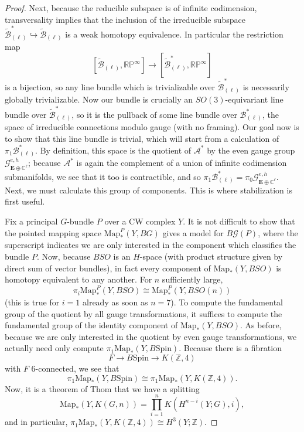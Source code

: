 \documentclass[10pt,a4paper]{amsart}
\theoremstyle{definition}
\theoremstyle{remark}
\numberwithin{figure}{qchap}
\begin{document}
\begin{proof}
Next, because the reducible subspace is of infinite codimension, transversality implies that the inclusion of the irreducible subspace $\widetilde{\mathcal B}_{(\ell)}^* \hookrightarrow \widetilde{\mathcal B}_{(\ell)}$ is a weak homotopy equivalence. In particular the restriction map $$[\widetilde{\mathcal B}_{(\ell)}, \mathbb{RP}^\infty] \to [\widetilde{\mathcal B}_{(\ell)}^*, \mathbb{RP}^\infty]$$ is a bijection, so any line bundle which is trivializable over $\widetilde{\mathcal B}_{(\ell)}^*$ is necessarily globally trivializable. Now our bundle is crucially an $SO(3)$-equivariant line bundle over $\widetilde{\mathcal B}_{(\ell)}^*$, so it is the pullback of some line bundle over $\mathcal B^{*}_{(\ell)}$, the space of irreducible connections modulo gauge (with no framing). Our goal now is to show that this line bundle is trivial, which will start from a calculation of $\pi_1 \mathcal B^*_{(\ell)}$. By definition, this space is the quotient of $\mathcal A^*$ by the even gauge group $\mathcal G^{e,h}_{\mathbf{E} \oplus \mathbb C^\ell}$; because $\mathcal A^*$ is again the complement of a union of infinite codimension submanifolds, we see that it too is contractible, and so $\pi_1 \mathcal B^*_{(\ell)} = \pi_0 \mathcal G^{e,h}_{\mathbf{E} \oplus \mathbb C^\ell}$. Next, we must calculate this group of components. This is where stabilization is first useful.

Fix a principal $G$-bundle $P$ over a CW complex $Y$. It is not difficult to show that the pointed mapping space $\text{Map}^P_*(Y, BG)$ gives a model for $B\mathcal G(P)$, where the superscript indicates we are only interested in the component which classifies the bundle $P$. Now, because $BSO$ is an $H$-space (with product structure given by direct sum of vector bundles), in fact every component of $\text{Map}_*(Y, BSO)$ is homotopy equivalent to any another. For $n$ sufficiently large, 
$$\pi_i \text{Map}^P_*(Y, BSO) \cong \text{Map}^P_*(Y, BSO(n))$$ 
(this is true for $i=1$ already as soon as $n = 7$). To compute the fundamental group of the quotient by all gauge transformations, it suffices to compute the fundamental group of the identity component of $\text{Map}_*(Y, BSO)$. As before, because we are only interested in the quotient by even gauge transformations, we actually need only compute $\pi_1 \text{Map}_*(Y, B\text{Spin})$. Because there is a fibration 
$$F \to B\text{Spin} \to K(\mathbb Z, 4)$$ 
with $F$ 6-connected, we see that 
$$\pi_1 \text{Map}_*(Y, B\text{Spin}) \cong \pi_1 \text{Map}_*(Y, K(\mathbb Z, 4)).$$ 
Now, it is a theorem of Thom \cite{ThomMappingSpaces} that we have a splitting $$\text{Map}_*(Y, K(G,n)) = \prod_{i=1}^n K(H^{n-i}(Y;G), i),$$ and in particular, $\pi_1 \text{Map}_*(Y, K(\mathbb Z, 4)) \cong H^3(Y;\mathbb Z)$.


\end{proof}
\end{document}
